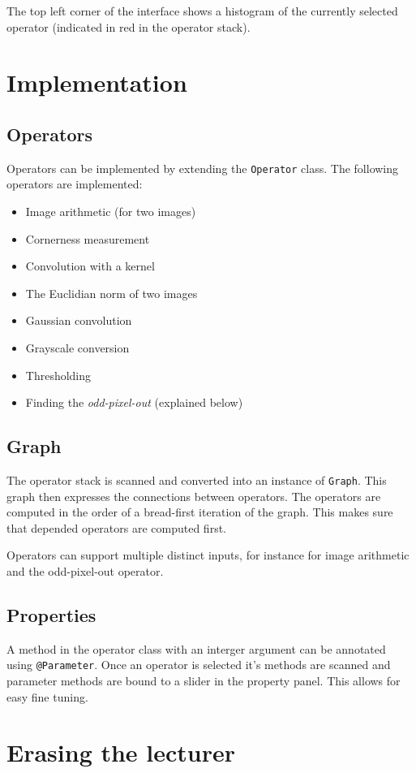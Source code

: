 \documentclass{article}
\begin{document}
The top left corner of the interface shows a histogram of the currently
selected operator (indicated in red in the operator stack).

\section{Implementation}
\subsection{Operators}
Operators can be implemented by extending the \texttt{Operator} class. The
following operators are implemented:
\begin{itemize}
\item Image arithmetic (for two images)
\item Cornerness measurement
\item Convolution with a kernel
\item The Euclidian norm of two images
\item Gaussian convolution
\item Grayscale conversion
\item Thresholding
\item Finding the \emph{odd-pixel-out} (explained below)
\end{itemize}

\subsection{Graph}
The operator stack is scanned and converted into an instance of \texttt{Graph}.
This graph then expresses the connections between operators. The operators are
computed in the order of a bread-first iteration of the graph. This makes sure
that depended operators are computed first.

Operators can support multiple distinct inputs, for instance for image
arithmetic and the odd-pixel-out operator.

\subsection{Properties}
A method in the operator class with an interger argument can be annotated using
\texttt{@Parameter}. Once an operator is selected it's methods are scanned and
parameter methods are bound to a slider in the property panel. This allows for
easy fine tuning.

\section{Erasing the lecturer}
\end{document}
